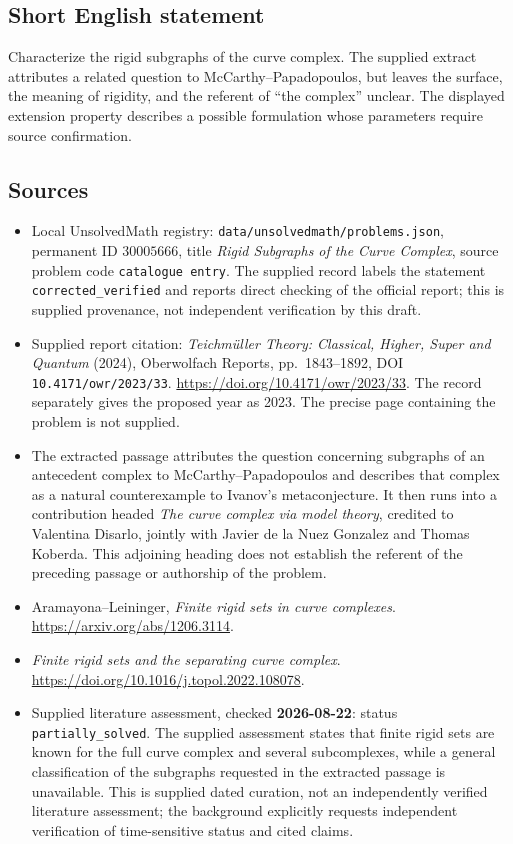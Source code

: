 \documentclass[11pt]{article}
\begin{document}
\subsection{Short English statement}
Characterize the rigid subgraphs of the curve complex. The supplied extract attributes a related question to McCarthy--Papadopoulos, but leaves the surface, the meaning of rigidity, and the referent of ``the complex'' unclear. The displayed extension property describes a possible formulation whose parameters require source confirmation.
\subsection{Sources}
\begin{itemize}
\item Local UnsolvedMath registry: \texttt{data/unsolvedmath/problems.json}, permanent ID \(30005666\), title \emph{Rigid Subgraphs of the Curve Complex}, source problem code \texttt{catalogue entry}. The supplied record labels the statement \texttt{corrected\_verified} and reports direct checking of the official report; this is supplied provenance, not independent verification by this draft.
\item Supplied report citation: \emph{Teichmüller Theory: Classical, Higher, Super and Quantum} (2024), Oberwolfach Reports, pp.~1843--1892, DOI \texttt{10.4171/owr/2023/33}. \url{https://doi.org/10.4171/owr/2023/33}. The record separately gives the proposed year as 2023. The precise page containing the problem is not supplied.
\item The extracted passage attributes the question concerning subgraphs of an antecedent complex to McCarthy--Papadopoulos and describes that complex as a natural counterexample to Ivanov's metaconjecture. It then runs into a contribution headed \emph{The curve complex via model theory}, credited to Valentina Disarlo, jointly with Javier de la Nuez Gonzalez and Thomas Koberda. This adjoining heading does not establish the referent of the preceding passage or authorship of the problem.
\item Aramayona--Leininger, \emph{Finite rigid sets in curve complexes}. \url{https://arxiv.org/abs/1206.3114}.
\item \emph{Finite rigid sets and the separating curve complex}. \url{https://doi.org/10.1016/j.topol.2022.108078}.
\item Supplied literature assessment, checked \textbf{2026-08-22}: status \texttt{partially\_solved}. The supplied assessment states that finite rigid sets are known for the full curve complex and several subcomplexes, while a general classification of the subgraphs requested in the extracted passage is unavailable. This is supplied dated curation, not an independently verified literature assessment; the background explicitly requests independent verification of time-sensitive status and cited claims.
\end{itemize}
\end{document}
